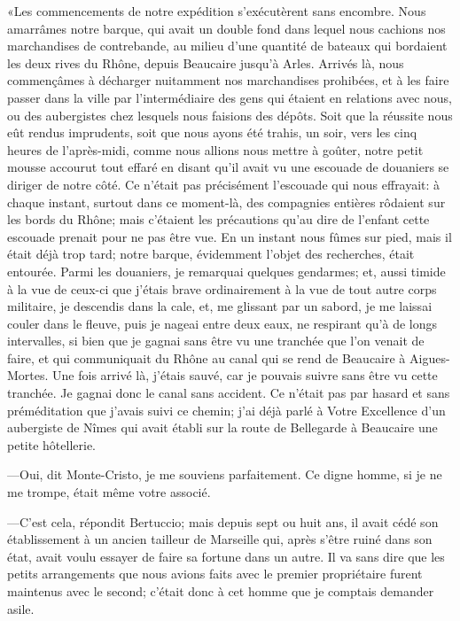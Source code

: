 «Les commencements de notre expédition s'exécutèrent sans encombre. Nous amarrâmes notre barque, qui avait un double fond dans lequel nous cachions nos marchandises de contrebande, au milieu d'une quantité de bateaux qui bordaient les deux rives du Rhône, depuis Beaucaire jusqu'à Arles. Arrivés là, nous commençâmes à décharger nuitamment nos marchandises prohibées, et à les faire passer dans la ville par l'intermédiaire des gens qui étaient en relations avec nous, ou des aubergistes chez lesquels nous faisions des dépôts. Soit que la réussite nous eût rendus imprudents, soit que nous ayons été trahis, un soir, vers les cinq heures de l'après-midi, comme nous allions nous mettre à goûter, notre petit mousse accourut tout effaré en disant qu'il avait vu une escouade de douaniers se diriger de notre côté. Ce n'était pas précisément l'escouade qui nous effrayait: à chaque instant, surtout dans ce moment-là, des compagnies entières rôdaient sur les bords du Rhône; mais c'étaient les précautions qu'au dire de l'enfant cette escouade prenait pour ne pas être vue. En un instant nous fûmes sur pied, mais il était déjà trop tard; notre barque, évidemment l'objet des recherches, était entourée. Parmi les douaniers, je remarquai quelques gendarmes; et, aussi timide à la vue de ceux-ci que j'étais brave ordinairement à la vue de tout autre corps militaire, je descendis dans la cale, et, me glissant par un sabord, je me laissai couler dans le fleuve, puis je nageai entre deux eaux, ne respirant qu'à de longs intervalles, si bien que je gagnai sans être vu une tranchée que l'on venait de faire, et qui communiquait du Rhône au canal qui se rend de Beaucaire à Aigues-Mortes. Une fois arrivé là, j'étais sauvé, car je pouvais suivre sans être vu cette tranchée. Je gagnai donc le canal sans accident. Ce n'était pas par hasard et sans préméditation que j'avais suivi ce chemin; j'ai déjà parlé à Votre Excellence d'un aubergiste de Nîmes qui avait établi sur la route de Bellegarde à Beaucaire une petite hôtellerie. 

—Oui, dit Monte-Cristo, je me souviens parfaitement. Ce digne homme, si je ne me trompe, était même votre associé. 

—C'est cela, répondit Bertuccio; mais depuis sept ou huit ans, il avait cédé son établissement à un ancien tailleur de Marseille qui, après s'être ruiné dans son état, avait voulu essayer de faire sa fortune dans un autre. Il va sans dire que les petits arrangements que nous avions faits avec le premier propriétaire furent maintenus avec le second; c'était donc à cet homme que je comptais demander asile. 

